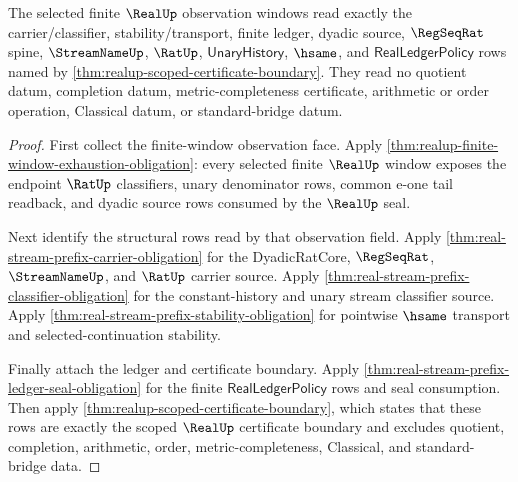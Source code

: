 \begin{theorem}
\label{thm:realup-scoped-finite-window-read-surface}
The selected finite $\RealUp$ observation windows read exactly the
carrier/classifier, stability/transport, finite ledger, dyadic source,
$\RegSeqRat$ spine, $\StreamNameUp$, $\RatUp$, $\mathsf{UnaryHistory}$,
$\hsame$, and $\mathsf{RealLedgerPolicy}$ rows named by
\autoref{thm:realup-scoped-certificate-boundary}. They read no quotient datum,
completion datum, metric-completeness certificate, arithmetic or order
operation, Classical datum, or standard-bridge datum.
\end{theorem}
\begin{proof}
First collect the finite-window observation face. Apply
\autoref{thm:realup-finite-window-exhaustion-obligation}: every selected finite
$\RealUp$ window exposes the endpoint $\RatUp$ classifiers, unary denominator
rows, common e-one tail readback, and dyadic source rows consumed by the
$\RealUp$ seal.

Next identify the structural rows read by that observation field. Apply
\autoref{thm:real-stream-prefix-carrier-obligation} for the DyadicRatCore,
$\RegSeqRat$, $\StreamNameUp$, and $\RatUp$ carrier source. Apply
\autoref{thm:real-stream-prefix-classifier-obligation} for the constant-history
and unary stream classifier source. Apply
\autoref{thm:real-stream-prefix-stability-obligation} for pointwise $\hsame$
transport and selected-continuation stability.

Finally attach the ledger and certificate boundary. Apply
\autoref{thm:real-stream-prefix-ledger-seal-obligation} for the finite
$\mathsf{RealLedgerPolicy}$ rows and seal consumption. Then apply
\autoref{thm:realup-scoped-certificate-boundary}, which states that these rows
are exactly the scoped $\RealUp$ certificate boundary and excludes quotient,
completion, arithmetic, order, metric-completeness, Classical, and
standard-bridge data.
\end{proof}

